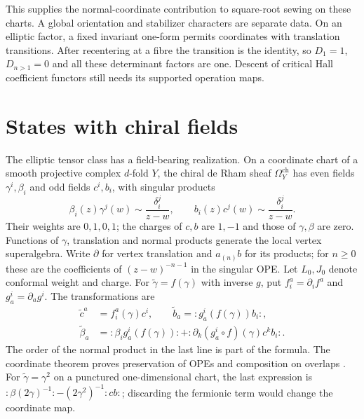 This supplies the normal-coordinate contribution
to square-root sewing on these charts. A global
orientation and stabilizer characters are separate
data. On an elliptic factor, a fixed invariant
one-form permits coordinates with translation
transitions. After recentering at a fibre the
transition is the identity, so $D_1=1$, $D_{n>1}=0$
and all these determinant factors are one. Descent
of critical Hall coefficient functors still needs
its supported operation maps.

\section{States with chiral fields}
\label{cyprim:sec:fields}

The elliptic tensor class has a field-bearing realization.
On a coordinate chart of a smooth projective complex $d$-fold $Y$,
the chiral de Rham sheaf $\Omega_Y^{\mathrm{ch}}$ has
even fields $\gamma^i,\beta_i$ and odd fields $c^i,b_i$,
with singular products
\begin{equation}\label{cyprim:eq:CDR-OPE}
 \beta_i(z)\gamma^j(w)\sim\frac{\delta_i^j}{z-w},
 \qquad b_i(z)c^j(w)\sim\frac{\delta_i^j}{z-w}.
\end{equation}
Their weights are $0,1,0,1$; the charges of $c,b$
are $1,-1$ and those of $\gamma,\beta$ are zero.
Functions of $\gamma$, translation and normal products
generate the local vertex superalgebra.
Write $\partial$ for vertex translation and $a_{(n)}b$
for its products; for $n\ge0$ these are the coefficients
of $(z-w)^{-n-1}$ in the singular OPE.
Let $L_0,J_0$ denote conformal weight and charge.
For $\widetilde\gamma=f(\gamma)$ with inverse $g$,
put $f_i^a=\partial_i f^a$ and $g_a^i=\partial_a g^i$.
The transformations are
\begin{equation}\label{cyprim:eq:CDR-coordinate}
\begin{split}
 \widetilde c^a&=f_i^a(\gamma)c^i,
 \qquad\widetilde b_a=:g_a^i(f(\gamma))b_i:,\\
 \widetilde\beta_a
   &=:\beta_i g_a^i(f(\gamma)):
     +:\partial_k(g_a^i\circ f)(\gamma)c^k b_i:.
\end{split}
\end{equation}
The order of the normal product in the last line
is part of the formula. The coordinate theorem
proves preservation of OPEs and composition on overlaps
\cite[\S~3]{rewriteMSV1999}.
For $\widetilde\gamma=\gamma^2$ on a punctured
one-dimensional chart, the last expression is
$:\beta(2\gamma)^{-1}:
-(2\gamma^2)^{-1}:cb:$; discarding the fermionic
term would change the coordinate map.

